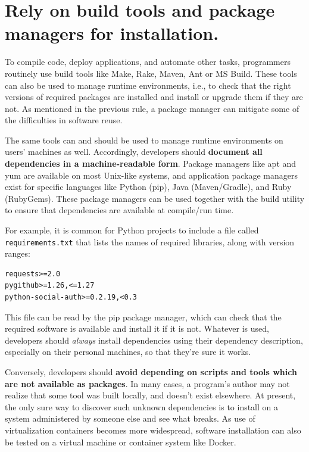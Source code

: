 \documentclass[10pt,letterpaper]{article}
\begin{document}
\section{Rely on build tools and package managers for installation.}

To compile code, deploy applications, and automate other tasks, 
programmers routinely use build tools like Make, Rake, Maven, Ant or MS Build.
These tools can also be used to manage runtime environments,
i.e.,
to check that the right versions of required packages are installed
and install or upgrade them if they are not.
As mentioned in the previous rule,
a package manager can mitigate some of the difficulties in software reuse.

The same tools can and should be used to manage runtime environments on users' machines as well.
Accordingly,
developers should
\textbf{document all dependencies in a machine-readable form}.
Package managers like apt and yum are available on most Unix-like systems, and
application package managers exist for specific languages like Python (pip),
Java (Maven/Gradle), and Ruby (RubyGems). These package managers can be used
together with the build utility to ensure that dependencies are available at
compile/run time.

For example, it is common for Python projects to include a file called
\texttt{requirements.txt} that lists the names of required libraries,
along with version ranges:

\begin{verbatim}
requests>=2.0
pygithub>=1.26,<=1.27
python-social-auth>=0.2.19,<0.3
\end{verbatim}

This file can be read by the pip package manager, which can check that the
required software is available and install it if it is not. 
Whatever is used,
developers should \emph{always} install dependencies
using their dependency description, especially on their personal machines, so that
they're sure it works.

Conversely, developers should
\textbf{avoid depending on scripts and tools which are not available as packages}.
In many cases, a program's author may not realize that some tool was built locally, and
doesn't exist elsewhere. At present, the only sure way to discover such
unknown dependencies is to install on a system administered by someone
else and see what breaks. As use of virtualization containers becomes more
widespread, software installation can also be tested on a virtual machine or
container system like Docker.
\end{document}
